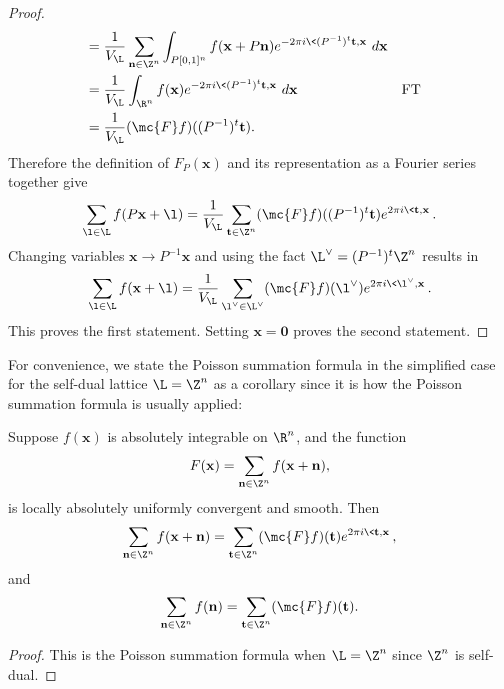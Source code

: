 \begin{proof}
\begin{align*}
          &= \frac{1}{V_{\L}}\sum_{\mathbf{n} \in \Z^{n}}\int_{P[0,1]^{n}}f(\mathbf{x}+P\mathbf{n})e^{-2\pi i\<(P^{-1})^{t}\mathbf{t},\mathbf{x}\>}\,d\mathbf{x} \\
          &= \frac{1}{V_{\L}}\int_{\R^{n}}f(\mathbf{x})e^{-2\pi i\<(P^{-1})^{t}\mathbf{t},\mathbf{x}\>}\,d\mathbf{x} && \text{FT} \\
          &= \frac{1}{V_{\L}}(\mc{F}f)((P^{-1})^{t}\mathbf{t}).
        \end{align*}
        Therefore the definition of $F_{P}(\mathbf{x})$ and its representation as a Fourier series together give
        \[
          \sum_{\l \in \L}f(P\mathbf{x}+\l) = \frac{1}{V_{\L}}\sum_{\mathbf{t} \in \Z^{n}}(\mc{F}f)((P^{-1})^{t}\mathbf{t})e^{2\pi i\<\mathbf{t},\mathbf{x}\>}.
        \]
        Changing variables $\mathbf{x} \to P^{-1}\mathbf{x}$ and using the fact $\L^{\vee} = (P^{-1})^{t}\Z^{n}$ results in
        \[
          \sum_{\l \in \L}f(\mathbf{x}+\l) = \frac{1}{V_{\L}}\sum_{\l^{\vee} \in \L^{\vee}}(\mc{F}f)(\l^{\vee})e^{2\pi i\<\l^{\vee},\mathbf{x}\>}.
        \]
        This proves the first statement. Setting $\mathbf{x} = \mathbf{0}$ proves the second statement.
      \end{proof}

      For convenience, we state the Poisson summation formula in the simplified case for the self-dual lattice $\L = \Z^{n}$ as a corollary since it is how the Poisson summation formula is usually applied:

      \begin{corollary}
        Suppose $f(\mathbf{x})$ is absolutely integrable on $\R^{n}$, and the function
        \[
          F(\mathbf{x}) = \sum_{\mathbf{n} \in \Z^{n}}f(\mathbf{x}+\mathbf{n}),
        \]
        is locally absolutely uniformly convergent and smooth. Then
        \[
          \sum_{\mathbf{n} \in \Z^{n}}f(\mathbf{x}+\mathbf{n}) = \sum_{\mathbf{t} \in \Z^{n}}(\mc{F}f)(\mathbf{t})e^{2\pi i\<\mathbf{t},\mathbf{x}\>},
        \]
        and
        \[
          \sum_{\mathbf{n} \in \Z^{n}}f(\mathbf{n}) = \sum_{\mathbf{t} \in \Z^{n}}(\mc{F}f)(\mathbf{t}).
        \]
      \end{corollary}
      \begin{proof}
        This is the Poisson summation formula when $\L = \Z^{n}$ since $\Z^{n}$ is self-dual.
      \end{proof}

